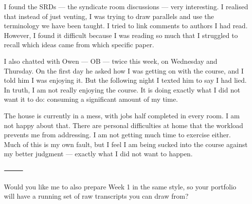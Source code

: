 I found the SRDs — the syndicate room discussions — very interesting. I realised that instead of just venting, I was trying to draw parallels and use the terminology we have been taught. I tried to link comments to authors I had read. However, I found it difficult because I was reading so much that I struggled to recall which ideas came from which specific paper.

I also chatted with Owen — OB — twice this week, on Wednesday and Thursday. On the first day he asked how I was getting on with the course, and I told him I was enjoying it. But the following night I texted him to say I had lied. In truth, I am not really enjoying the course. It is doing exactly what I did not want it to do: consuming a significant amount of my time.

The house is currently in a mess, with jobs half completed in every room. I am not happy about that. There are personal difficulties at home that the workload prevents me from addressing. I am not getting much time to exercise either. Much of this is my own fault, but I feel I am being sucked into the course against my better judgment — exactly what I did not want to happen.

⸻

Would you like me to also prepare Week 1 in the same style, so your portfolio will have a running set of raw transcripts you can draw from?
